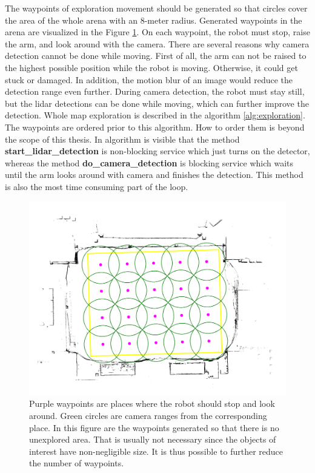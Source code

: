The waypoints of exploration movement should be generated so that circles cover the area of the whole arena with an 8-meter radius. Generated waypoints in the arena are visualized in the Figure \ref{fig:map_annot}. On each waypoint, the robot must stop, raise the arm, and look around with the camera. There are several reasons why camera detection cannot be done while moving. First of all, the arm can not be raised to the highest possible position while the robot is moving. Otherwise, it could get stuck or damaged. In addition, the motion blur of an image would reduce the detection range even further. During camera detection, the robot must stay still, but the lidar detections can be done while moving, which can further improve the detection. Whole map exploration is described in the algorithm \ref{alg:exploration}. The waypoints are ordered prior to this algorithm. How to order them is beyond the scope of this thesis. In algorithm is visible that the method \textbf{start\_lidar\_detection} is non-blocking service which just turns on the detector, whereas the method \textbf{do\_camera\_detection} is blocking service which waits until the arm looks around with camera and finishes the detection. This method is also the most time consuming part of the loop.

\begin{figure}[H]
	\centering
	\includegraphics[scale=0.25]{fig/map_annotation.png}
	\caption[Generated waypoints]{Purple waypoints are places where the robot should stop and look around. Green circles are camera ranges from the corresponding place. In this figure are the waypoints generated so that there is no unexplored area. That is usually not necessary since the objects of interest have non-negligible size. It is thus possible to further reduce the number of waypoints.}
	\label{fig:map_annot}
\end{figure}

